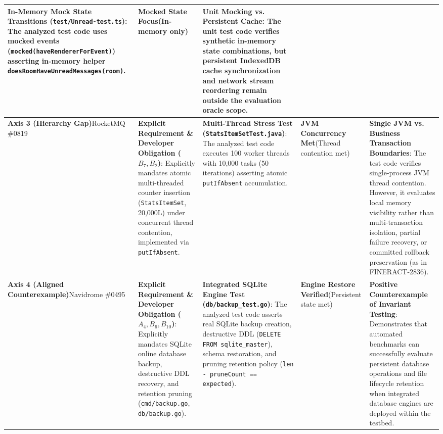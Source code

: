 \begin{table}[t]
\begin{tabularx}{\textwidth}{p{2.0cm} p{3.2cm} p{2.8cm} p{2.0cm} X}
\textbf{In-Memory Mock State Transitions (\texttt{test/Unread-test.ts})}:\newline
The analyzed test code uses mocked events (\texttt{mocked(haveRendererForEvent)}) asserting in-memory helper \texttt{doesRoomHaveUnreadMessages(room)}. & 
\textbf{Mocked State Focus}\newline (In-memory only) & 
\textbf{Unit Mocking vs. Persistent Cache}:\newline
The unit test code verifies synthetic in-memory state combinations, but persistent IndexedDB cache synchronization and network stream reordering remain outside the evaluation oracle scope. \\
\midrule
\textbf{Axis 3 (Hierarchy Gap)}\newline RocketMQ \#0819 & 
\textbf{Explicit Requirement \& Developer Obligation ($B_7, B_2$)}:\newline
Explicitly mandates atomic multi-threaded counter insertion (\texttt{StatsItemSet}, 20,000L) under concurrent thread contention, implemented via \texttt{putIfAbsent}. & 
\textbf{Multi-Thread Stress Test (\texttt{StatsItemSetTest.java})}:\newline
The analyzed test code executes 100 worker threads with 10,000 tasks (50 iterations) asserting atomic \texttt{putIfAbsent} accumulation. & 
\textbf{JVM Concurrency Met}\newline (Thread contention met) & 
\textbf{Single JVM vs. Business Transaction Boundaries}:\newline
The test code verifies single-process JVM thread contention. However, it evaluates local memory visibility rather than multi-transaction isolation, partial failure recovery, or committed rollback preservation (as in FINERACT-2836). \\
\midrule
\textbf{Axis 4 (Aligned Counterexample)}\newline Navidrome \#0495 & 
\textbf{Explicit Requirement \& Developer Obligation ($A_4, B_6, B_{10}$)}:\newline
Explicitly mandates SQLite online database backup, destructive DDL recovery, and retention pruning (\texttt{cmd/backup.go}, \texttt{db/backup.go}). & 
\textbf{Integrated SQLite Engine Test (\texttt{db/backup\_test.go})}:\newline
The analyzed test code asserts real SQLite backup creation, destructive DDL (\texttt{DELETE FROM sqlite\_master}), schema restoration, and pruning retention policy (\texttt{len - pruneCount == expected}). & 
\textbf{Engine Restore Verified}\newline (Persistent state met) & 
\textbf{Positive Counterexample of Invariant Testing}:\newline
Demonstrates that automated benchmarks can successfully evaluate persistent database operations and file lifecycle retention when integrated database engines are deployed within the testbed. \\
\bottomrule
\end{tabularx}
\end{table}
